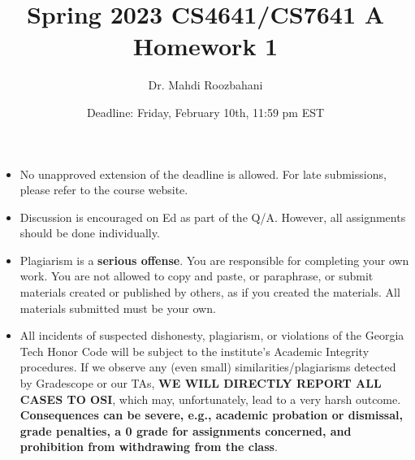\documentclass{article}
\title{Spring 2023 CS4641/CS7641 A Homework 1}
\author{Dr. Mahdi Roozbahani}
\date{Deadline: Friday, February 10th, 11:59 pm EST}
\begin{document}
\maketitle
\begin{itemize}
    \item No unapproved extension of the deadline is allowed. For late submissions, please refer to the course website.
    \item Discussion is encouraged on Ed as part of the Q/A. However, all assignments should be done individually.
    \item \color{red}Plagiarism is a \textbf{serious offense}. You are responsible for completing your own work. You are not allowed to copy and paste, or paraphrase, or submit materials created or published by others, as if you created the materials. All materials submitted must be your own.\color{black}
    \item \color{red}All incidents of suspected dishonesty, plagiarism, or violations of the Georgia Tech Honor Code will be subject to the institute’s Academic Integrity procedures. If we observe any (even small) similarities/plagiarisms detected by Gradescope or our TAs, \textbf{WE WILL DIRECTLY REPORT ALL CASES TO OSI}, which may, unfortunately, lead to a very harsh outcome. \textbf{Consequences can be severe, e.g., academic probation or dismissal, grade penalties, a 0 grade for assignments concerned, and prohibition from withdrawing from the class}.
\end{itemize}
\end{document}
